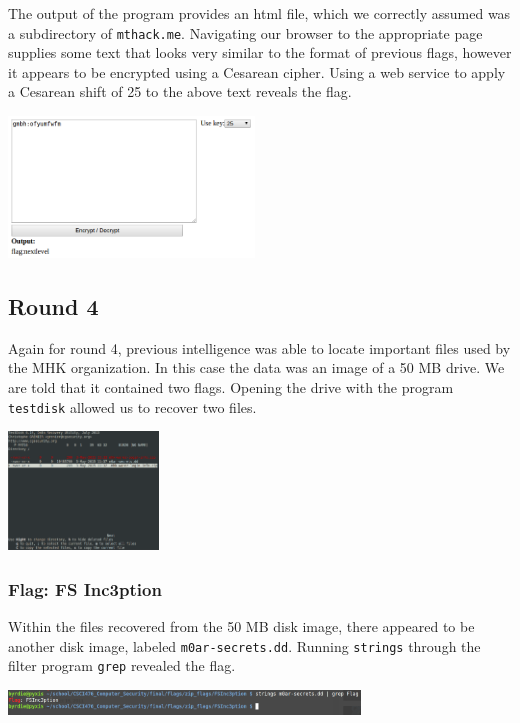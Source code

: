 \documentclass[10pt,a4paper,titlepage]{article}
\begin{document}
The output of the program provides an html file, which we correctly assumed was a subdirectory of \texttt{mthack.me}. Navigating our browser to the appropriate page supplies some text that looks very similar to the format of previous flags, however it appears to be encrypted using a Cesarean cipher. Using a web service \cite{ceasar} to apply a Cesarean shift of 25 to the above text reveals the flag.
\begin{center}
\includegraphics[width=0.49\textwidth]{binary_flags/nextlevel/ceasar}
\end{center} 
\subsection{Round 4}
Again for round 4, previous intelligence was able to locate important files used by the MHK organization. In this case the data was an image of a 50 MB drive. We are told that it contained two flags. Opening the drive with the program \texttt{testdisk} allowed us to recover two files.
\begin{center}
\includegraphics[width=0.3\textwidth]{zip_flags/testdisk}
\end{center}
\subsubsection{Flag: FS Inc3ption}
Within the files recovered from the 50 MB disk image, there appeared to be another disk image, labeled \texttt{m0ar-secrets.dd}. Running \texttt{strings} through the filter program \texttt{grep} revealed the flag.
\begin{center}
\includegraphics[width=0.7\textwidth]{zip_flags/FSInc3ption/flag2}
\end{center}
\end{document}
